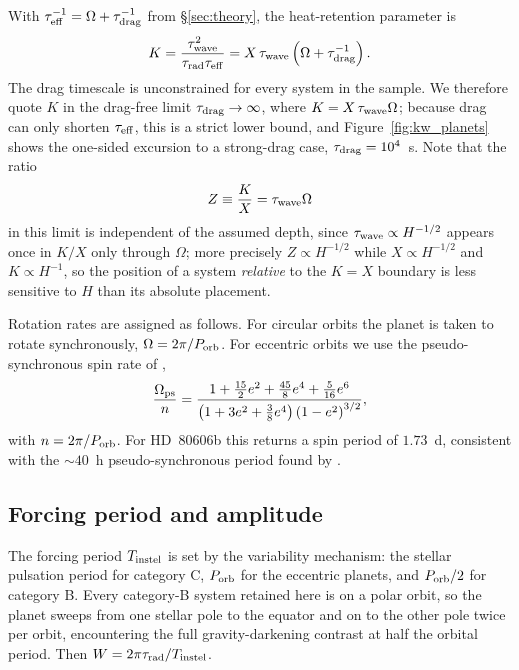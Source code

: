 \documentclass[trackchanges,twocolumn]{aastex7}
\begin{document}
With $\tau_{\rm eff}^{-1} = \Omega + \tau_{\rm drag}^{-1}$ from \S\ref{sec:theory}, the heat-retention parameter is
\begin{equation}
    K = \frac{\tau_{\rm wave}^{2}}{\tau_{\rm rad}\tau_{\rm eff}}
      = X\,\tau_{\rm wave}\left(\Omega + \tau_{\rm drag}^{-1}\right).
    \label{eq:app_K}
\end{equation}
The drag timescale is unconstrained for every system in the sample. We therefore quote $K$ in the drag-free limit $\tau_{\rm drag}\to\infty$, where $K = X\,\tau_{\rm wave}\Omega$; because drag can only shorten $\tau_{\rm eff}$, this is a strict lower bound, and Figure~\ref{fig:kw_planets} shows the one-sided excursion to a strong-drag case, $\tau_{\rm drag} = 10^{4}$~s. Note that the ratio
\begin{equation}
    Z \equiv \frac{K}{X} = \tau_{\rm wave}\Omega
    \label{eq:app_Z}
\end{equation}
in this limit is independent of the assumed depth, since $\tau_{\rm wave} \propto H^{-1/2}$ appears once in $K/X$ only through $\Omega$; more precisely $Z \propto H^{-1/2}$ while $X \propto H^{-1/2}$ and $K \propto H^{-1}$, so the position of a system \emph{relative} to the $K = X$ boundary is less sensitive to $H$ than its absolute placement.

Rotation rates are assigned as follows. For circular orbits the planet is taken to rotate synchronously, $\Omega = 2\pi/P_{\rm orb}$. For eccentric orbits we use the pseudo-synchronous spin rate of \cite{Hut1981},
\begin{equation}
    \frac{\Omega_{\rm ps}}{n} = \frac{1 + \tfrac{15}{2}e^{2} + \tfrac{45}{8}e^{4} + \tfrac{5}{16}e^{6}}
                                     {\left(1 + 3e^{2} + \tfrac{3}{8}e^{4}\right)\left(1-e^{2}\right)^{3/2}},
    \label{eq:app_hut}
\end{equation}
with $n = 2\pi/P_{\rm orb}$. For HD~80606b this returns a spin period of $1.73$~d, consistent with the ${\sim}40$~h pseudo-synchronous period found by \cite{LangtonLaughlin2008}.

\subsection{Forcing period and amplitude}

The forcing period $T_{\rm instel}$ is set by the variability mechanism: the stellar pulsation period for category C, $P_{\rm orb}$ for the eccentric planets, and $P_{\rm orb}/2$ for category B. Every category-B system retained here is on a polar orbit, so the planet sweeps from one stellar pole to the equator and on to the other pole twice per orbit, encountering the full gravity-darkening contrast at half the orbital period. Then $W = 2\pi\tau_{\rm rad}/T_{\rm instel}$.
\end{document}
